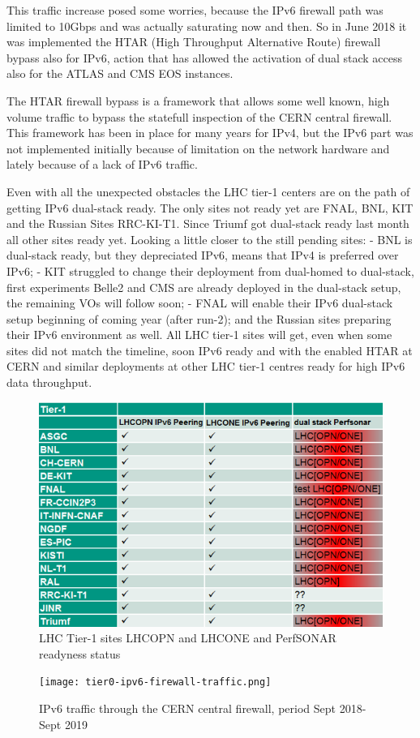 This traffic increase posed some worries, because the IPv6 firewall path was limited to 10Gbps and was actually saturating now and then. So in June 2018 it was implemented the HTAR (High Throughput Alternative Route) firewall bypass also for IPv6, action that has allowed the activation of dual stack access also for the ATLAS and CMS EOS instances.    
 
The HTAR firewall bypass is a framework that allows some well known, high volume traffic to bypass the statefull inspection of the CERN central firewall. This framework has been in place for many years for IPv4, but the IPv6 part was not implemented initially because of limitation on the network hardware and lately because of a lack of IPv6 traffic.  

Even with all the unexpected obstacles the LHC tier-1 centers are on the path of getting IPv6 dual-stack ready. The only sites not ready yet are FNAL, BNL, KIT and the Russian Sites RRC-KI-T1. Since Triumf got dual-stack ready last month all other sites ready yet. Looking a little closer to the still pending sites: 
-	BNL is dual-stack ready, but they depreciated IPv6, means that IPv4 is preferred over IPv6;
-	KIT struggled to change their deployment from dual-homed to dual-stack, first experiments Belle2 and CMS are already deployed in the dual-stack setup, the remaining VOs will follow soon; 
-	FNAL will enable their IPv6 dual-stack setup beginning of coming year (after run-2); and the Russian sites preparing their IPv6 environment as well.
All LHC tier-1 sites will get, even when some sites did not match the timeline, soon IPv6 ready and with the enabled HTAR at CERN and similar deployments at other LHC tier-1 centres ready for high IPv6 data throughput.

\begin{figure}[h!]
\centering
\includegraphics[width=5.6 in]{LHCOPN+ONE_status.png}
\caption{LHC Tier-1 sites LHCOPN and LHCONE and PerfSONAR readyness status}
\label{fig:LHC[OPN/ONE] Tier-1 readyness status}
\end{figure}

\begin{figure}[h!]
\centering
\texttt{[image: tier0-ipv6-firewall-traffic.png]}
\caption{IPv6 traffic through the CERN central firewall, period Sept 2018-Sept 2019}
\label{fig:tier0-traffic}
\end{figure}
